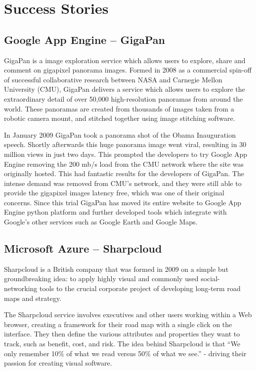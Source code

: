 \chapter{Success Stories}
\section{Google App Engine -- GigaPan}
GigaPan is a image exploration service which allows users to explore, share and comment on gigapixel panorama images. Formed in 2008 as a commercial spin-off of successful collaborative research between NASA and Carnegie Mellon University (CMU), GigaPan delivers a service which allows users to explore the extraordinary detail of over 50,000 high-resolution panoramas from around the world. These panoramas are created from thousands of images taken from a robotic camera mount, and stitched together using image stitching software\ftSgaeOne.
\ftSgaeOneText

In January 2009 GigaPan took a panorama shot of the Obama Inauguration speech. Shortly afterwards this huge panorama image went viral, resulting in 30 million views in just two days. This prompted the developers to try Google App Engine removing the 200 mb/s load from the CMU network where the site was originally hosted. This had fantastic results for the developers of GigaPan. The intense demand was removed from CMU's network, and they were still able to provide the gigapixel images latency free, which was one of their original concerns\ftSgaeTwo. Since this trial GigaPan has moved its entire website to Google App Engine python platform and further developed tools which integrate with Google's other services such as Google Earth and Google Maps\ftSgaeThree.
\ftSgaeTwoText\ftSgaeThreeText

\section{Microsoft Azure -- Sharpcloud}
Sharpcloud is a British company that was formed in 2009 on a simple but groundbreaking idea: to apply highly visual and commonly used social-networking tools to the crucial corporate project of developing long-term road maps and strategy. 

The Sharpcloud service involves executives and other users working within a Web browser, creating a framework for their road map with a single click on the interface. They then define the various attributes and properties they want to track, such as benefit, cost, and risk. The idea behind Sharpcloud is that ``We only remember 10\% of what we read versus 50\% of what we see.''\ftSAzOne{} - driving their passion for creating visual software.
\ftSAzOneText

